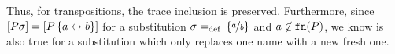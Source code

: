 Thus, for transpositions, the trace inclusion is preserved. Furthermore, since $\left[P\sigma\right]=\left[P\left\{a\leftrightarrow{}b\right\}\right]$ for a substitution $\sigma=_{\mathrm{def}}{}\left\{\nicefrac{a}{b}\right\}$ and $a\not\in\mathtt{fn}(P)$, we know  is also true for a substitution which only replaces one name with a new fresh one.
